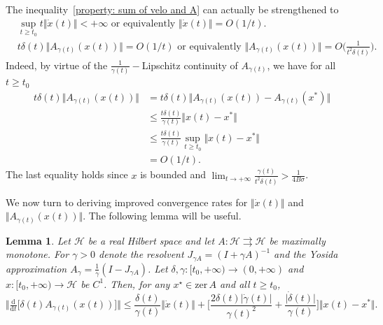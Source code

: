 \documentclass[11pt]{article}
\numberwithin{equation}{section}
\newtheorem{lemma}{Lemma}[section]
\begin{document}
The inequality~\eqref{property: sum of velo and A} can actually be strengthened to 
\begin{align}
     &\sup_{t\geq t_0}t\Vert \dot{x}(t)\Vert <+\infty \text{ or equivalently } \Vert \dot{x}(t) \Vert={O}({1}/{t}). \label{convergence: velocity} \\
    &t\delta(t)\Big\Vert A_{\gamma(t)}(x(t)) \Big\Vert = {O}({1}/{t}) \text{ or equivalently } \Big\Vert A_{\gamma(t)}(x(t)) \Big\Vert= O\Big(\frac{1}{t^2\delta(t)}\Big). \label{BigO_gradient}
\end{align}
Indeed, by virtue of the $\frac{1}{\gamma(t)}-$Lipschitz continuity of $A_{\gamma(t)}$, we have for all $t \geq t_0$
\begin{align*}
  t\delta(t)\Big\Vert A_{\gamma(t)}(x(t)) \Big\Vert&=t\delta(t)\Big\Vert A_{\gamma(t)}(x(t))-A_{\gamma(t)}(x^*) \Big\Vert \\
  &\le  \frac{t\delta(t)}{\gamma(t)}\Vert x(t)-x^* \Vert \\
  &\le \frac{t\delta(t)}{\gamma(t)}\sup_{t \geq t_0} \Vert x(t)-x^* \Vert\\
  &={O}(1/t).
\end{align*}
The last equality holds since $x$ is bounded and $\lim_{t\to +\infty}\frac{\gamma(t)}{t^2\delta(t)}>\frac{1}{4B\sigma}$. 

We now turn to deriving improved convergence rates for $\Vert \dot{x}(t) \Vert $ and $\Vert A_{\gamma(t)}(x(t)) \Vert $. 
The following lemma will be useful.

\begin{lemma}\label{lem:derivative of moreau}
Let $\mathcal H$ be a real Hilbert space and let $A:\mathcal H\rightrightarrows\mathcal H$ be maximally monotone.
For $\gamma>0$ denote the resolvent $J_{\gamma A}=(I+\gamma A)^{-1}$ and the Yosida approximation $A_\gamma=\frac{1}{\gamma}(I-J_{\gamma A})$.
Let $\delta,\gamma:[t_0,+\infty)\to(0,+\infty)$ and $x:[t_0,+\infty)\to\mathcal H$ be $C^1$. Then, for any $x^{\star}\in\mathrm{zer}\,A$ and all $t\ge t_0$,
\[
\Big\Vert \tfrac{\mathrm{d}}{\mathrm{d}t}\big[\delta(t)A_{\gamma(t)}(x(t))\big] \Big\Vert
\le \frac{\delta(t)}{\gamma(t)}\Vert \dot{x}(t) \Vert
+ \Big[\frac{2\delta(t)\vert \dot{\gamma}(t)\vert}{\gamma(t)^2}
+ \frac{\vert \dot{\delta}(t)\vert}{\gamma(t)}\Big]\Vert x(t)-x^* \Vert .
\]
\end{lemma}
\end{document}
